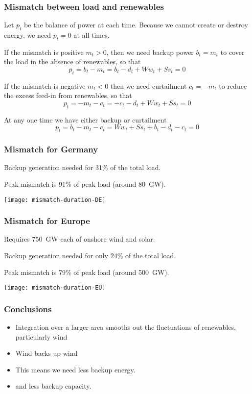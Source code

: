 \documentclass[10pt,aspectratio=169,dvipsnames]{beamer}
\let\olditem\item
\renewcommand{\item}{%
\olditem\vspace{5pt}}
\begin{document}
\begin{frame}
  \frametitle{Mismatch between load and renewables}

  Let $p_t$ be the balance of power at each time. Because we cannot
  create or destroy energy, we need $p_t = 0$ at all times.

  If the mismatch is positive $m_t > 0$, then we need \alert{backup power} $b_t = m_t$
  to cover the load in the absence of renewables, so that
  \begin{equation*}
    p_t = b_t - m_t =  b_t - d_t  + Ww_t + Ss_t = 0
  \end{equation*}

  If the mismatch is negative $m_t < 0$ then we need \alert{curtailment} $c_t = -m_t$
  to reduce the excess feed-in from renewables, so that
  \begin{equation*}
    p_t =  - m_t - c_t = -c_t - d_t + Ww_t + Ss_t = 0
  \end{equation*}

  At any one time we have either backup or curtailment
  \begin{equation*}
    p_t = b_t - m_t - c_t = Ww_t + Ss_t + b_t - d_t - c_t = 0
  \end{equation*}


\end{frame}

\begin{frame}
  \frametitle{Mismatch for Germany}

  Backup generation needed for 31\% of the total load.

  Peak mismatch is 91\% of peak load (around 80~GW).

  \centering
  \texttt{[image: mismatch-duration-DE]}


\end{frame}



\begin{frame}
  \frametitle{Mismatch for Europe}

  Requires 750~GW each of onshore wind and solar.

  Backup generation needed for only 24\% of the total load.

  Peak mismatch is 79\% of peak load (around 500~GW).

  \centering
  \texttt{[image: mismatch-duration-EU]}


\end{frame}


\begin{frame}
  \frametitle{Conclusions}

  \begin{itemize}
  \item Integration over a larger area smooths out the fluctuations of
    renewables, particularly wind
  \item Wind backs up wind
  \item This means we need \alert{less backup energy}.
  \item and \alert{less backup capacity}.
  \end{itemize}


\end{frame}
\end{document}
